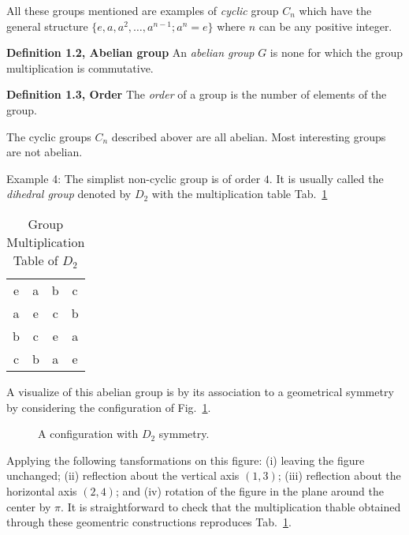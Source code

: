 All these groups mentioned are examples of \textit{cyclic} group $C_{n}$ which have the general structure $\{e, a, a^{2}, \dots, a^{n-1}; a^{n}=e\}$ where $n$ can be any positive integer.

\textbf{Definition 1.2, Abelian group} An \textit{abelian group} $G$ is none for which the group multiplication is commutative.

\textbf{Definition 1.3, Order} The \textit{order} of a group is the number of elements of the group.

The cyclic groups $C_{n}$ described abover are all abelian.
Most interesting groups are not abelian.

\textrm{Example 4}: The simplist non-cyclic group is of order $4$.
It is usually called the \textit{dihedral group} denoted by $D_{2}$ with the multiplication table Tab.~\ref{tab:1-3}
\begin{table}
  \centering
  \begin{tabular}{c c c c}
    \hline
    e & a & b & c \\
    a & e & c & b \\
    b & c & e & a \\
    c & b & a & e \\
    \hline
  \end{tabular}
  \caption{Group Multiplication Table of $D_2$}
  \label{tab:1-3}
\end{table}

A visualize of this abelian group is by its association to a geometrical symmetry by considering the configuration of
Fig.~\ref{fig:1-1}.
\begin{figure}[h]
  \centering
  \caption{A configuration with $D_2$ symmetry.}
  \label{fig:1-1}
\end{figure}
Applying the following tansformations on this figure: (i) leaving the figure unchanged; (ii) reflection about the vertical axis $(1,3)$; (iii) reflection about the horizontal axis $(2,4)$; and (iv) rotation of the figure in the plane around the center by $\pi$.
It is straightforward to check that the multiplication thable obtained through these geomentric constructions reproduces Tab.~\ref{tab:1-3}.

